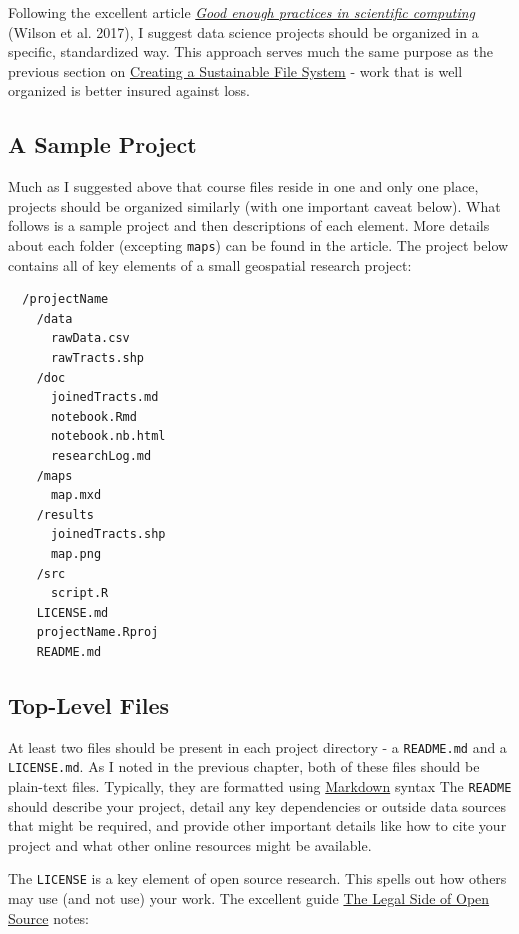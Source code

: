 \documentclass[]{book}
\theoremstyle{definition}
\theoremstyle{definition}
\theoremstyle{definition}
\theoremstyle{remark}
\begin{document}
Following the excellent article
\href{http://journals.plos.org/ploscompbiol/article?id=10.1371/journal.pcbi.1005510}{\emph{Good
enough practices in scientific computing}} (Wilson et al. 2017), I
suggest data science projects should be organized in a specific,
standardized way. This approach serves much the same purpose as the
previous section on
\protect\hyperlink{creating-a-sustainable-file-system}{Creating a
Sustainable File System} - work that is well organized is better insured
against loss.

\subsection{A Sample Project}\label{a-sample-project}

Much as I suggested above that course files reside in one and only one
place, projects should be organized similarly (with one important caveat
below). What follows is a sample project and then descriptions of each
element. More details about each folder (excepting \texttt{maps}) can be
found in the article. The project below contains all of key elements of
a small geospatial research project:

\begin{verbatim}
  /projectName
    /data
      rawData.csv
      rawTracts.shp
    /doc
      joinedTracts.md
      notebook.Rmd
      notebook.nb.html
      researchLog.md
    /maps
      map.mxd
    /results
      joinedTracts.shp
      map.png
    /src
      script.R
    LICENSE.md
    projectName.Rproj
    README.md
\end{verbatim}

\subsection{Top-Level Files}\label{top-level-files}

At least two files should be present in each project directory - a
\texttt{README.md} and a \texttt{LICENSE.md}. As I noted in the previous
chapter, both of these files should be plain-text files. Typically, they
are formatted using \protect\hyperlink{markdown}{Markdown} syntax The
\texttt{README} should describe your project, detail any key
dependencies or outside data sources that might be required, and provide
other important details like how to cite your project and what other
online resources might be available.

The \texttt{LICENSE} is a key element of open source research. This
spells out how others may use (and not use) your work. The excellent
guide \href{https://opensource.guide/}{The Legal Side of Open Source}
notes:
\end{document}
